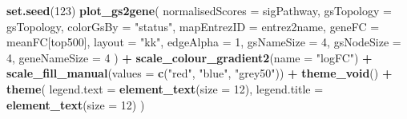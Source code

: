 \documentclass[9pt,a4paper,]{extarticle}
\newenvironment{Shaded}{\begin{snugshade}}{\end{snugshade}}
\newcommand{\AttributeTok}[1]{\textcolor[rgb]{0.13,0.29,0.53}{#1}}
\newcommand{\DecValTok}[1]{\textcolor[rgb]{0.00,0.00,0.81}{#1}}
\newcommand{\FunctionTok}[1]{\textcolor[rgb]{0.13,0.29,0.53}{\textbf{#1}}}
\newcommand{\NormalTok}[1]{#1}
\newcommand{\SpecialCharTok}[1]{\textcolor[rgb]{0.81,0.36,0.00}{\textbf{#1}}}
\newcommand{\StringTok}[1]{\textcolor[rgb]{0.31,0.60,0.02}{#1}}
\begin{document}
\begin{Shaded}
\begin{Highlighting}[]
\FunctionTok{set.seed}\NormalTok{(}\DecValTok{123}\NormalTok{)}
\FunctionTok{plot\_gs2gene}\NormalTok{(}
    \AttributeTok{normalisedScores =}\NormalTok{ sigPathway, }
    \AttributeTok{gsTopology =}\NormalTok{ gsTopology, }
    \AttributeTok{colorGsBy =} \StringTok{"status"}\NormalTok{, }
    \AttributeTok{mapEntrezID =}\NormalTok{ entrez2name, }
    \AttributeTok{geneFC =}\NormalTok{ meanFC[top500], }
    \AttributeTok{layout =} \StringTok{"kk"}\NormalTok{,}
    \AttributeTok{edgeAlpha =} \DecValTok{1}\NormalTok{, }
    \AttributeTok{gsNameSize =} \DecValTok{4}\NormalTok{, }
    \AttributeTok{gsNodeSize =} \DecValTok{4}\NormalTok{,}
    \AttributeTok{geneNameSize =} \DecValTok{4}
\NormalTok{) }\SpecialCharTok{+}
    \FunctionTok{scale\_colour\_gradient2}\NormalTok{(}\AttributeTok{name =} \StringTok{"logFC"}\NormalTok{) }\SpecialCharTok{+}
    \FunctionTok{scale\_fill\_manual}\NormalTok{(}\AttributeTok{values =} \FunctionTok{c}\NormalTok{(}\StringTok{"red"}\NormalTok{, }\StringTok{"blue"}\NormalTok{, }\StringTok{"grey50"}\NormalTok{)) }\SpecialCharTok{+}
    \FunctionTok{theme\_void}\NormalTok{() }\SpecialCharTok{+}
    \FunctionTok{theme}\NormalTok{(}
        \AttributeTok{legend.text =} \FunctionTok{element\_text}\NormalTok{(}\AttributeTok{size =} \DecValTok{12}\NormalTok{),}
        \AttributeTok{legend.title =} \FunctionTok{element\_text}\NormalTok{(}\AttributeTok{size =} \DecValTok{12}\NormalTok{)}
\NormalTok{    )}
\end{Highlighting}
\end{Shaded}
\end{document}
